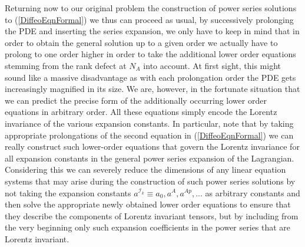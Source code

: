 \documentclass[a4paper,12pt, DIV=14, BCOR=5mm, twoside, headsepline, numbers=noenddot]{scrbook}
\begin{document}
Returning now to our original problem the construction of power series solutions to (\ref{DiffeoEqnFormal}) we thus can proceed as usual, by successively prolonging the PDE and inserting the series expansion, we only have to keep in mind that in order to obtain the general solution up to a given order we actually have to prolong to one order higher in order to take the additional lower order equations stemming from the rank defect at $N_A$ into account.  At first sight, this might sound like a massive disadvantage as with each prolongation order the PDE gets increasingly magnified in its size. We are, however, in the fortunate situation that we can predict the precise form of the additionally occurring lower order equations in arbitrary order. All these equations simply encode the Lorentz invariance of the various expansion constants. In particular, note that by taking appropriate prolongations of the second equation in (\ref{DiffeoEqnFormal}) we can really construct such lower-order equations that govern the Lorentz invariance for all expansion constants in the general power series expansion of the Lagrangian. 
Considering this we can severely reduce the dimensions of any linear equation systems that may arise during the construction of such power series solutions by not taking the expansion constants $a^{\mathcal{I}_k} \equiv a_0, a^A, a^{Ap},...$ as arbitrary constants and then solve the appropriate newly obtained lower order equations to ensure that they describe the components of Lorentz invariant tensors, but by including from the very beginning only such expansion coefficients in the power series that are Lorentz invariant.
\end{document}
